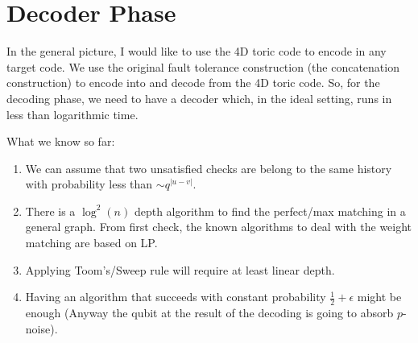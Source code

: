 

\section{Decoder Phase}
In the general picture, I would like to use the 4D toric code to encode in any target code. We use the original fault tolerance construction (the concatenation construction) to encode into and decode from the 4D toric code. So, for the decoding phase, we need to have a decoder which, in the ideal setting, runs in less than logarithmic time.

What we know so far: 
\begin{enumerate}
  \item We can assume that two unsatisfied checks are belong to the same history with probability less than $\sim q^{|u - v|}$. 
  \item There is a $\log^{2}(n)$ depth algorithm to find the perfect/max matching in a general graph. From first check, the known algorithms to deal with the weight matching are based on LP.    
  \item Applying Toom's/Sweep rule will require at least linear depth.  
  \item Having an algorithm that succeeds with constant probability $\frac{1}{2} + \epsilon$ might be enough (Anyway the qubit at the result of the decoding is going to absorb $p$-noise).  

\end{enumerate}
